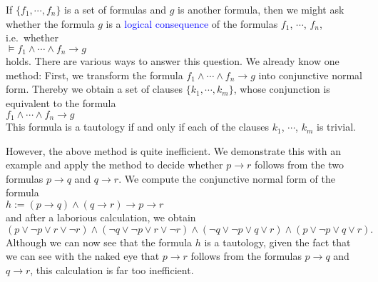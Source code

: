 If $\{f_1,\cdots,f_n\}$ is a set of formulas and $g$ is another formula, then
we might ask whether the formula $g$ is a \textcolor{blue}{logical consequence} of the formulas $f_1$,
$\cdots$, $f_n$, i.e.~whether
\\[0.2cm]
\hspace*{1.3cm}
$\models f_1 \wedge \cdots \wedge f_n \rightarrow g$
\\[0.2cm]
holds.
There are various ways to answer this question.  We already know one method:
First, we transform the formula $f_1 \wedge \cdots \wedge f_n \rightarrow g$ into
conjunctive normal form.  Thereby we obtain a set of clauses
$\{k_1,\cdots,k_m\}$, whose conjunction is equivalent to the formula
\\[0.2cm]
\hspace*{1.3cm}
$f_1 \wedge \cdots \wedge f_n \rightarrow g$
\\[0.2cm]
This formula is a tautology if and only if each of the clauses $k_1$, $\cdots$, $k_m$ is trivial.

However, the above method is quite inefficient. We demonstrate this with an
example and apply the method
to decide whether $p \rightarrow r$ follows from the two formulas $p \rightarrow q$ and
$q \rightarrow r$. We compute the conjunctive normal form of the formula
\\[0.2cm]
\hspace*{1.3cm}
$h := (p \rightarrow q) \wedge (q \rightarrow r) \rightarrow p \rightarrow r$
\\[0.2cm]
and after a laborious calculation, we obtain
\\[0.2cm]
\hspace*{1.3cm}
$(p \vee \neg p \vee r \vee \neg r) \wedge (\neg q \vee \neg p \vee r \vee \neg r) \wedge
     (\neg q \vee \neg p \vee q \vee r) \wedge (p \vee \neg p \vee q \vee r).
$
\\[0.2cm]
Although we can now see that the formula $h$ is a tautology, given the
fact that we can see with the naked eye that $p \rightarrow r$ follows from the formulas $p \rightarrow q$ and
$q \rightarrow r$, this calculation is far too inefficient.

